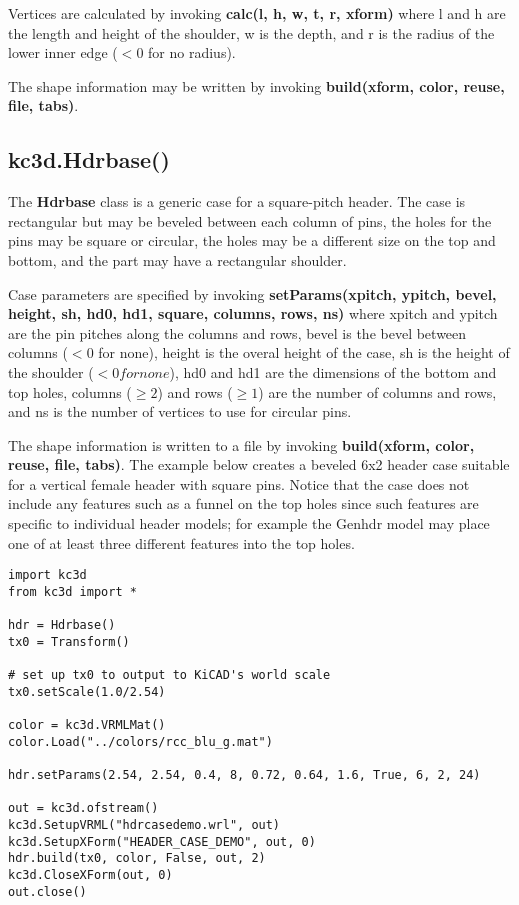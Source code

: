 \documentclass[a4paper, dvipdfm]{article}
\begin{document}
Vertices are calculated by invoking \textbf{calc(l, h, w, t, r, xform)} where l and h are the length
and height of the shoulder, w is the depth, and r is the radius of the lower inner edge ($<0$ for no radius).

The shape information may be written by invoking \textbf{build(xform, color, reuse, file, tabs)}.

\subsection{kc3d.Hdrbase()}
The \textbf{Hdrbase} class is a generic case for a square-pitch header. The case is rectangular but
may be beveled between each column of pins, the holes for the pins may be square or circular, the
holes may be a different size on the top and bottom, and the part may have a rectangular shoulder.

Case parameters are specified by invoking \textbf{setParams(xpitch, ypitch, bevel, height, sh, hd0,
hd1, square, columns, rows, ns)} where xpitch and ypitch are the pin pitches along the columns and
rows, bevel is the bevel between columns ($<0$ for none), height is the overal height of the case,
sh is the height of the shoulder ($<0 for none$), hd0 and hd1 are the dimensions of the bottom and
top holes, columns ($\ge2$) and rows ($\ge1$) are the number of columns and rows, and ns is the number
of vertices to use for circular pins.

The shape information is written to a file by invoking \textbf{build(xform, color, reuse, file, tabs)}.
The example below creates a beveled 6x2 header case suitable for a vertical female header with square pins.
Notice that the case does not include any features such as a funnel on the top holes since such features
are specific to individual header models; for example the Genhdr model may place one of at least three
different features into the top holes.

\begin{verbatim}
import kc3d
from kc3d import *

hdr = Hdrbase()
tx0 = Transform()

# set up tx0 to output to KiCAD's world scale
tx0.setScale(1.0/2.54)

color = kc3d.VRMLMat()
color.Load("../colors/rcc_blu_g.mat")

hdr.setParams(2.54, 2.54, 0.4, 8, 0.72, 0.64, 1.6, True, 6, 2, 24)

out = kc3d.ofstream()
kc3d.SetupVRML("hdrcasedemo.wrl", out)
kc3d.SetupXForm("HEADER_CASE_DEMO", out, 0)
hdr.build(tx0, color, False, out, 2)
kc3d.CloseXForm(out, 0)
out.close()
\end{verbatim}
\end{document}
